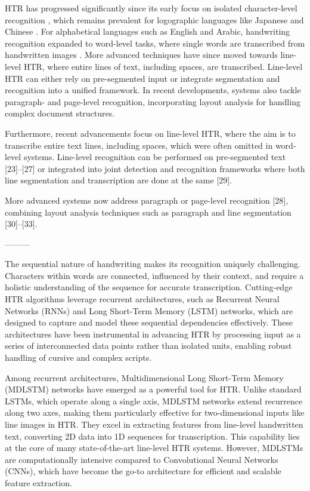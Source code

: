 \documentclass[conference]{IEEEtran}
\begin{document}
HTR has progressed significantly since its early focus on isolated character-level recognition \cite{cilia2019ranking}, which remains prevalent for logographic languages like Japanese \cite{clanuwat2019kuronet}  and Chinese \cite{jaderberg2015spatial}. For alphabetical languages such as English and Arabic, handwriting recognition expanded to word-level tasks, where single words are transcribed from handwritten images \cite{bhunia2019handwriting, such2018fully}. More advanced techniques have since moved towards line-level HTR, where entire lines of text, including spaces, are transcribed. Line-level HTR can either rely on pre-segmented input or integrate segmentation and recognition into a unified framework. In recent developments, systems also tackle paragraph- and page-level recognition, incorporating layout analysis for handling complex document structures.

Furthermore, recent advancements focus on line-level HTR, where the aim is to transcribe entire text lines, including spaces, which were often omitted in word-level systems. Line-level recognition can be performed on pre-segmented text [23]–[27] or integrated into joint detection and recognition frameworks where both line segmentation and transcription are done at the same  [29]. 

More advanced systems now address paragraph or page-level recognition [28], combining layout analysis techniques such as paragraph and line segmentation [30]–[33]. 

---------


The sequential nature of handwriting makes its recognition uniquely challenging. Characters within words are connected, influenced by their context, and require a holistic understanding of the sequence for accurate transcription. Cutting-edge HTR algorithms leverage recurrent architectures, such as Recurrent Neural Networks (RNNs) and Long Short-Term Memory (LSTM) networks, which are designed to capture and model these sequential dependencies effectively. These architectures have been instrumental in advancing HTR by processing input as a series of interconnected data points rather than isolated units, enabling robust handling of cursive and complex scripts.

Among recurrent architectures, Multidimensional Long Short-Term Memory (MDLSTM) networks have emerged as a powerful tool for HTR. Unlike standard LSTMs, which operate along a single axis, MDLSTM networks extend recurrence along two axes, making them particularly effective for two-dimensional inputs like line images in HTR. They excel in extracting features from line-level handwritten text, converting 2D data into 1D sequences for transcription. This capability lies at the core of many state-of-the-art line-level HTR systems. However, MDLSTMs are computationally intensive compared to Convolutional Neural Networks (CNNs), which have become the go-to architecture for efficient and scalable feature extraction.
\end{document}

